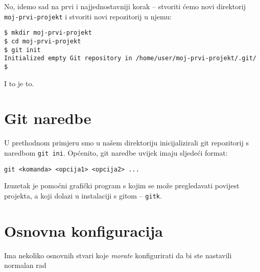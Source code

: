 No, idemo sad na prvi i najjednostavniji korak -- stvoriti ćemo novi direktorij \verb+moj-prvi-projekt+ i stvoriti novi repozitorij u njemu:

\begin{verbatim}
$ mkdir moj-prvi-projekt
$ cd moj-prvi-projekt
$ git init
Initialized empty Git repository in /home/user/moj-prvi-projekt/.git/
$ 
\end{verbatim}

I to je to. 

\section*{Git naredbe}

U prethodnom primjeru smo u našem direktoriju inicijalizirali git repozitorij s naredbom \verb+git ini+.
Općenito, git naredbe uvijek imaju sljedeći format:

\begin{verbatim}
git <komanda> <opcija1> <opcija2> ...
\end{verbatim}

Izuzetak je pomoćni grafički program s kojim se može pregledavati povijest projekta, a koji dolazi u instalaciji s gitom -- \verb+gitk+.

\section*{Osnovna konfiguracija}

Ima nekoliko osnovnih stvari koje \emph{morate} konfigurirati da bi ste nastavili normalan rad


